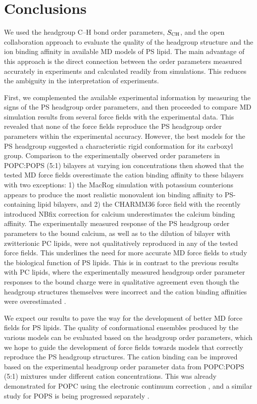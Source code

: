 \documentclass[journal=jpcbfk,manuscript=article]{achemso}
\begin{document}
\section{Conclusions}

We used the headgroup C--H bond order parameters, $S_{\rm CH}$, and the open collaboration approach to evaluate the quality
of the headgroup structure and the ion binding affinity 
in available MD models of PS lipid.
The main advantage of this approach is the direct connection
between the order parameters measured accurately in experiments and calculated readily from simulations. 
This reduces the ambiguity in the interpretation of experiments.

First, we complemented the available experimental information \cite{browning80,roux90} by measuring the signs of the PS headgroup order parameters,
and then proceeded to compare MD simulation results from several force fields with the experimental data.
This revealed that none of the force fields
reproduce the PS headgroup order parameters within the experimental accuracy. However,
the best models for the PS headgroup suggested a characteristic rigid conformation for its
carboxyl group. Comparison to the experimentally observed order parameters in POPC:POPS (5:1) bilayers  at varying ion
concentrations \cite{roux90} then showed that the tested MD force fields
overestimate the cation binding affinity to these bilayers with two exceptions: 1) the MacRog simulation with potassium counterions appears to produce the most realistic monovalent ion binding
affinity to PS-containing lipid bilayers, and 2) the CHARMM36 force field with the recently introduced
NBfix correction for calcium \cite{kim16} underestimates the calcium binding affinity.
The experimentally measured response of the PS headgroup order parameters to the bound calcium, as well as to the dilution of bilayer with zwitterionic PC lipids, were not
qualitatively reproduced in any of the tested force fields. This underlines the need for more accurate
MD force fields to study the biological function of PS lipids.
This is in contrast to the previous results with PC lipids,
where the experimentally measured headgroup order parameter responses to the bound charge
were in qualitative agreement even though the headgroup structures themselves were
incorrect and the cation binding affinities were overestimated \cite{catte16}.

We expect our results to pave the way for the development of better MD force fields
for PS lipids. The quality of conformational ensembles produced by the various models can be evaluated based on the headgroup order parameters, which we hope to guide the development of force fields towards models that correctly reproduce the PS headgroup structures. The cation binding can be improved based on the experimental headgroup order parameter data from POPC:POPS (5:1) mixtures under different cation concentrations. This was already demonstrated for POPC using the electronic continuum correction \cite{melcr18}, and a similar study for POPS is being progressed separately \cite{ECCpops}.
\end{document}
